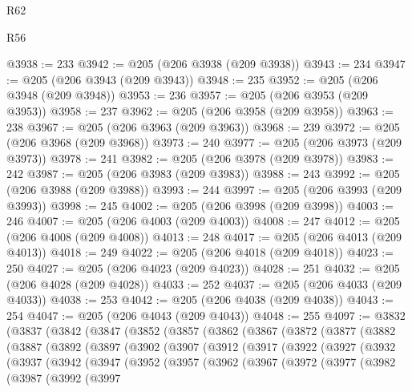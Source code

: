 \begin{lexlean}{R62}
\begin{lexlean}{R56}
\begin{coremodule}
{{{{{{{{{{{{{{{{{{{{{{{{{{{{{{{{{{{{{{{{{{{{{{{{{{{{{{{{{{{{{{{{{{{{{{{{{{{{{{{{{{{{{{{{{{{{{{{{{{{{{{{{{{{{{{{{{{{{{{{{{{{{{{{{{{{{{{{{{{{{{{{{{{{{{{{{{{{{{{{{{{{{{{{{{{{{{{{{{{{{{{{{{{{{{{{{{{{{{{{{{{{{{{{{{{{@3938 := 233
@3942 := @205 (@206 @3938 (@209 @3938))
@3943 := 234
@3947 := @205 (@206 @3943 (@209 @3943))
@3948 := 235
@3952 := @205 (@206 @3948 (@209 @3948))
@3953 := 236
@3957 := @205 (@206 @3953 (@209 @3953))
@3958 := 237
@3962 := @205 (@206 @3958 (@209 @3958))
@3963 := 238
@3967 := @205 (@206 @3963 (@209 @3963))
@3968 := 239
@3972 := @205 (@206 @3968 (@209 @3968))
@3973 := 240
@3977 := @205 (@206 @3973 (@209 @3973))
@3978 := 241
@3982 := @205 (@206 @3978 (@209 @3978))
@3983 := 242
@3987 := @205 (@206 @3983 (@209 @3983))
@3988 := 243
@3992 := @205 (@206 @3988 (@209 @3988))
@3993 := 244
@3997 := @205 (@206 @3993 (@209 @3993))
@3998 := 245
@4002 := @205 (@206 @3998 (@209 @3998))
@4003 := 246
@4007 := @205 (@206 @4003 (@209 @4003))
@4008 := 247
@4012 := @205 (@206 @4008 (@209 @4008))
@4013 := 248
@4017 := @205 (@206 @4013 (@209 @4013))
@4018 := 249
@4022 := @205 (@206 @4018 (@209 @4018))
@4023 := 250
@4027 := @205 (@206 @4023 (@209 @4023))
@4028 := 251
@4032 := @205 (@206 @4028 (@209 @4028))
@4033 := 252
@4037 := @205 (@206 @4033 (@209 @4033))
@4038 := 253
@4042 := @205 (@206 @4038 (@209 @4038))
@4043 := 254
@4047 := @205 (@206 @4043 (@209 @4043))
@4048 := 255
@4097 := @3832
    (@3837
      (@3842
        (@3847
          (@3852
            (@3857
              (@3862
                (@3867
                  (@3872
                    (@3877
                      (@3882
                        (@3887
                          (@3892
                            (@3897
                              (@3902
                                (@3907
                                  (@3912
                                    (@3917
                                      (@3922
                                        (@3927
                                          (@3932
                                            (@3937
                                              (@3942
                                                (@3947
                                                  (@3952
                                                    (@3957
                                                      (@3962
                                                        (@3967
                                                          (@3972
                                                            (@3977
                                                              (@3982
                                                                (@3987
                                                                  (@3992
                                                                    (@3997
}}}}}}}}}}}}}}}}}}}}}}}}}}}}}}}}}}}}}}}}}}}}}}}}}}}}}}}}}}}}}}}}}}}}}}}}}}}}}}}}}}}}}}}}}}}}}}}}}}}}}}}}}}}}}}}}}}}}}}}}}}}}}}}}}}}}}}}}}}}}}}}}}}}}}}}}}}}}}}}}}}}}}}}}}}}}}}}}}}}}}}}}}}}}}}}}}}}}}}}}}}}}}}}}}}}
\end{coremodule}
\end{lexlean}
\end{lexlean}
